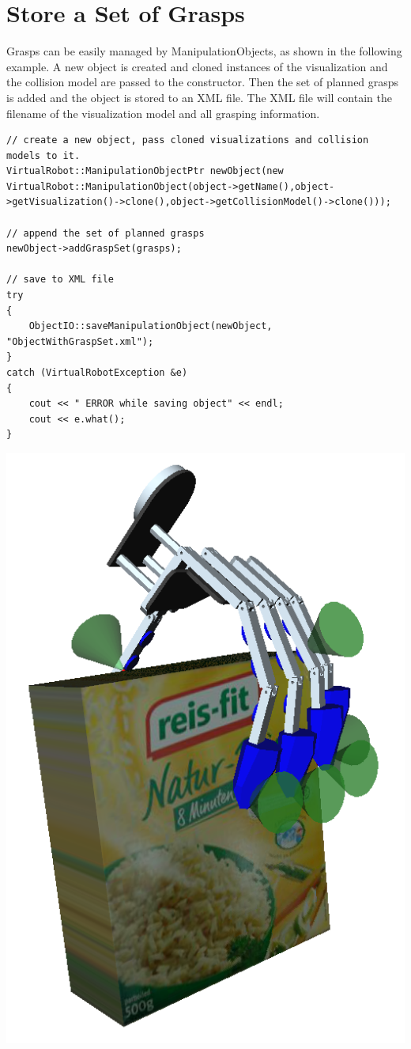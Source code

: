 \section{Store a Set of Grasps}
Grasps can be easily managed by ManipulationObjects, as shown in the following example. A new object is created and cloned instances of the visualization and the collision model are passed to the constructor. Then the set of planned grasps is added and the object is stored to an XML file. The XML file will contain the filename of the visualization model and all grasping information.
\begin{lstlisting}
// create a new object, pass cloned visualizations and collision models to it.
VirtualRobot::ManipulationObjectPtr newObject(new VirtualRobot::ManipulationObject(object->getName(),object->getVisualization()->clone(),object->getCollisionModel()->clone()));

// append the set of planned grasps
newObject->addGraspSet(grasps);

// save to XML file
try
{
    ObjectIO::saveManipulationObject(newObject, "ObjectWithGraspSet.xml");
}
catch (VirtualRobotException &e)
{
    cout << " ERROR while saving object" << endl;
    cout << e.what();
}
\end{lstlisting}
\includegraphics[width=\textwidth]{Grasp1}
